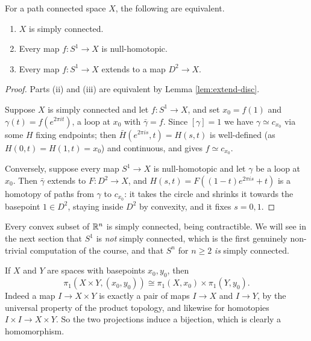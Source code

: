 \documentclass[a4paper]{scrartcl}
\begin{document}
\begin{proposition} \label{prop:sc-equiv}
	For a path connected space $X$, the following are equivalent.
	\begin{enumerate}
		\item $X$ is simply connected.
		\item Every map $f: S^1 \to X$ is null-homotopic.
		\item Every map $f: S^1 \to X$ extends to a map $D^2 \to X$.
	\end{enumerate}
\end{proposition}
\begin{proof}
	Parts (ii) and (iii) are equivalent by Lemma \ref{lem:extend-disc}.

	Suppose $X$ is simply connected and let $f: S^1 \to X$, and set $x_0 = f(1)$ and $\gamma(t) = f(e^{2\pi i t})$, a loop at $x_0$ with $\bar\gamma = f$. Since $[\gamma] = 1$ we have $\gamma \simeq c_{x_0}$ via some $H$ fixing endpoints; then $\bar H(e^{2\pi i s}, t) = H(s,t)$ is well-defined (as $H(0,t) = H(1,t) = x_0$) and continuous, and gives $f \simeq c_{x_0}$.

	Conversely, suppose every map $S^1 \to X$ is null-homotopic and let $\gamma$ be a loop at $x_0$. Then $\bar\gamma$ extends to $F: D^2 \to X$, and $H(s,t) = F((1-t)e^{2\pi i s} + t)$ is a homotopy of paths from $\gamma$ to $c_{x_0}$: it takes the circle and shrinks it towards the basepoint $1 \in D^2$, staying inside $D^2$ by convexity, and it fixes $s = 0, 1$.
\end{proof}

\begin{example}
	Every convex subset of $\mathbb{R}^n$ is simply connected, being contractible. We will see in the next section that $S^1$ is \emph{not} simply connected, which is the first genuinely non-trivial computation of the course, and that $S^n$ for $n \geq 2$ \emph{is} simply connected.
\end{example}

\begin{example} \label{ex:pi1-product}
	If $X$ and $Y$ are spaces with basepoints $x_0, y_0$, then
	$$
	\pi_1(X \times Y, (x_0,y_0)) \cong \pi_1(X,x_0) \times \pi_1(Y,y_0).
	$$
	Indeed a map $I \to X \times Y$ is exactly a pair of maps $I \to X$ and $I \to Y$, by the universal property of the product topology, and likewise for homotopies $I \times I \to X\times Y$. So the two projections induce a bijection, which is clearly a homomorphism.
\end{example}
\end{document}
